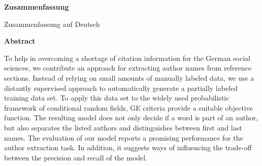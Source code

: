 \begin{center}
  \begin{large}
  \bfseries{Zusammenfassung}
  \end{large}
\end{center}
Zusammenfassung auf Deutsch
\par\bigskip
\par\bigskip
{}
\begin{center}
  \begin{large}
  \bfseries{Abstract}
  \end{large}
\end{center}
To help in overcoming a shortage of citation information for the German social sciences, we contribute an approach for extracting author names from reference sections.
Instead of relying on small amounts of manually labeled data, we use a distantly supervised approach to automatically generate a partially labeled training data set.
To apply this data set to the widely used probabilistic framework of conditional random fields, GE criteria provide a suitable objective function.
The resulting model does not only decide if a word is part of an author, but also separates the listed authors and distinguishes between first and last names.
The evaluation of our model reports a promising performance for the author extraction task.
In addition, it suggests ways of influencing the trade-off between the precision and recall of the model.
